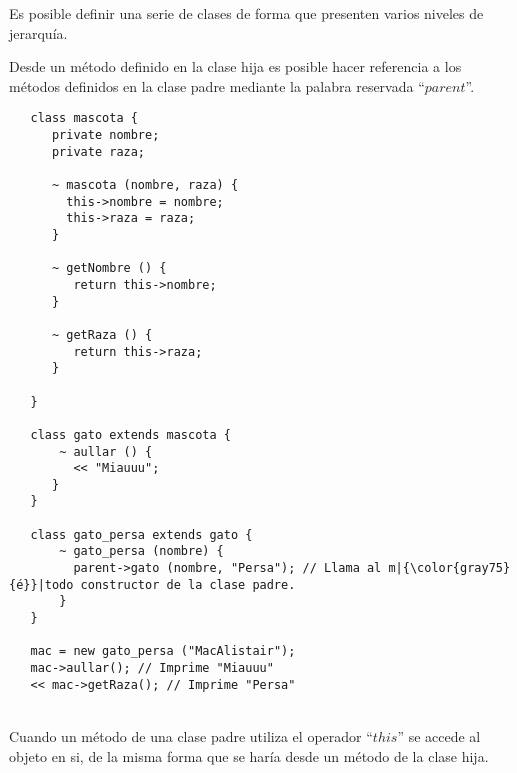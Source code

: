 Es posible definir una serie de clases de forma que presenten varios niveles de jerarquía.


 
Desde un método definido en la clase hija es posible hacer referencia a los métodos definidos en la clase padre 
mediante la palabra reservada ``$parent$''. \\

\begin{lstlisting}
   class mascota {
      private nombre; 
      private raza;
      
      ~ mascota (nombre, raza) { 
        this->nombre = nombre; 
        this->raza = raza;
      }
      
      ~ getNombre () {
         return this->nombre;
      }
      
      ~ getRaza () {
         return this->raza;
      }
      
   }

   class gato extends mascota {
       ~ aullar () { 
         << "Miauuu";
      }
   }

   class gato_persa extends gato {
       ~ gato_persa (nombre) {
         parent->gato (nombre, "Persa"); // Llama al m|{\color{gray75}{é}}|todo constructor de la clase padre.
       }
   }
   
   mac = new gato_persa ("MacAlistair"); 
   mac->aullar(); // Imprime "Miauuu"
   << mac->getRaza(); // Imprime "Persa"
\end{lstlisting}
\hfill\\ 

Cuando un método de una clase padre utiliza el operador ``$this$'' se accede al objeto
en si, de la misma forma que se haría desde un método de la clase hija.  \\

